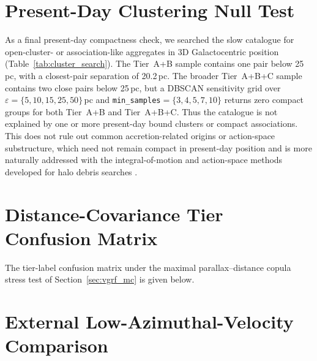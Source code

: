 \documentclass{aa}  %
\begin{document}
\clearpage

\section{Present-Day Clustering Null Test} \label{app:dbscan}

As a final present-day compactness check, we searched the slow catalogue
for open-cluster- or association-like aggregates in 3D Galactocentric
position (Table~\ref{tab:cluster_search}).  The Tier~A+B sample contains
one pair below 25\,pc, with a closest-pair separation of 20.2\,pc.  The
broader Tier~A+B+C sample contains two close pairs below 25\,pc, but a
DBSCAN sensitivity grid \citep{Ester1996,Schubert2017} over
$\varepsilon=\{5,10,15,25,50\}$\,pc and
\texttt{min\_samples}$=\{3,4,5,7,10\}$ returns zero compact groups for
both Tier~A+B and Tier~A+B+C.  Thus the catalogue is not explained by
one or more present-day bound clusters or compact associations.  This
does not rule out common accretion-related origins or action-space
substructure, which need not remain compact in present-day position and
is more naturally addressed with the integral-of-motion and action-space
methods developed for halo debris searches
\citep{HelmiDeZeeuw2000,Borsato2020,Lovdal2022,Dodd2023}.



\section{Distance-Covariance Tier Confusion Matrix} \label{app:covariance}

The tier-label confusion matrix under the maximal parallax--distance
copula stress test of Section~\ref{sec:vgrf_mc} is given below.



\clearpage

\section{External Low-Azimuthal-Velocity Comparison} \label{app:filion}
\end{document}

